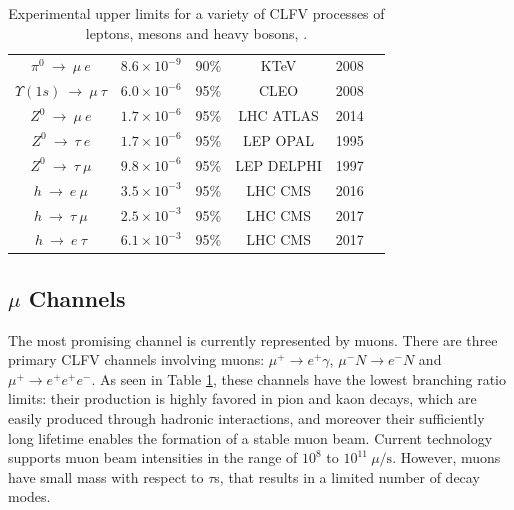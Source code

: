\begin{center}
\begin{table}[!h]
\begin{tabular}{c c c c c c}
$\pi^0 \ \rightarrow \ \mu \ e$ & $8.6 \times 10^{-9}$ & 90\% & KTeV & 2008 & \cite{KTeV:2007cvy}\\
$\Upsilon (1s) \ \rightarrow \ \mu \ \tau $ & $6.0 \times 10^{-6}$ & 95\% & CLEO & 2008 & \cite{Love_2008}\\
\hline
$Z^0 \ \rightarrow \ \mu \ e$ & $1.7 \times 10^{-6}$ & 95\% &  LHC ATLAS & 2014 & \cite{Aad_2014} \\
$Z^0 \ \rightarrow \ \tau \ e$ & $1.7 \times 10^{-6}$ & 95\% &  LEP OPAL & 1995 & \cite{akers}\\
$Z^0 \ \rightarrow \ \tau \ \mu$ & $9.8 \times 10^{-6}$ & 95\% &  LEP DELPHI & 1997 & \cite{abreu}\\
$h \ \rightarrow \ e \ \mu$ & $3.5 \times 10^{-3}$ & 95\% & LHC CMS & 2016 & \cite{PhysRevD.104.032013}\\
$h \ \rightarrow \ \tau  \ \mu$ & $2.5 \times 10^{-3}$ & 95\% & LHC CMS & 2017 & \cite{cms17}\\
$h \ \rightarrow \ e \ \tau$ & $6.1 \times 10^{-3}$ & 95\% & LHC CMS & 2017 & \cite{cms17}\\
\hline
\end{tabular}
\caption{Experimental upper limits for a variety of CLFV processes of leptons, mesons and heavy bosons, \cite{clfv_signorelli}.}
\label{tab:upperlimits}
\end{table}
\end{center}
\vspace{-15mm}
\subsection{$\mu$ Channels}
The most promising channel is currently represented by muons. 
There are three primary CLFV channels involving muons: 
$\mu^+ \rightarrow e^+ \gamma$, $\mu^- N \rightarrow e^- N$ and $\mu^+ \rightarrow e^+ e^+ e^-$. 
As seen in Table \ref{tab:upperlimits}, 
these channels have the lowest branching ratio limits: 
their production is highly favored in pion and kaon decays, 
which are easily produced through hadronic interactions, and  
moreover their sufficiently long lifetime enables the 
formation of a stable muon beam. Current technology 
supports muon beam intensities in the range of $10^8$ to $10^{11} \ \mu/\text{s}$.
However, muons have small mass with respect to $\tau$s, that results in a limited number of decay modes. 


